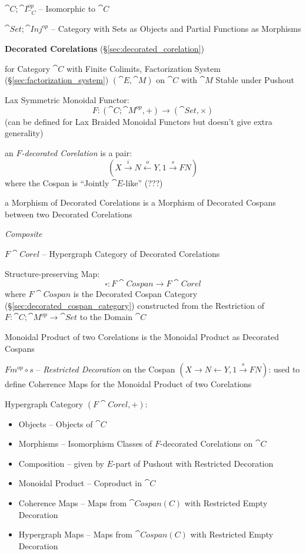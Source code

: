 $\cat{C};\cat{I}_{\cat{C}}^{op}$ -- Isomorphic to $\cat{C}$

$\cat{Set};\cat{Inj}^{op}$ -- Category with Sets as Objects and
Partial Functions as Morphisms


\textbf{Decorated Corelations} (\S\ref{sec:decorated_corelation})

for Category $\cat{C}$ with Finite Colimits, Factorization System
(\S\ref{sec:factorization_system}) $(\cat{E},\cat{M})$ on $\cat{C}$
with $\cat{M}$ Stable under Pushout

Lax Symmetric Monoidal Functor:
\[
  F : (\cat{C};\cat{M}^{op}, +) \rightarrow (\cat{Set}, \times)
\]
(can be defined for Lax Braided Monoidal Functors but doesn't give
extra generality)

an \emph{$F$-decorated Corelation} is a pair:
\[
  (X \xrightarrow{i} N \xleftarrow{o} Y, 1 \xrightarrow{s} F N)
\]
where the Cospan is ``Jointly $\cat{E}$-like'' (???) %

a Morphism of Decorated Corelations is a Morphism of Decorated Cospans
between two Decorated Corelations


\emph{Composite} %


\asterism


$F\cat{Corel}$ -- Hypergraph Category of Decorated Corelations

Structure-preserving Map:
\[
  \square : F\cat{Cospan} \rightarrow F\cat{Corel}
\]
where $F\cat{Cospan}$ is the Decorated Cospan Category
(\S\ref{sec:decorated_cospan_category}) constructed from the
Restriction of $F : \cat{C};\cat{M}^{op} \rightarrow \cat{Set}$ to the
Domain $\cat{C}$

Monoidal Product of two Corelations is the Monoidal Product as
Decorated Cospans

$F m^{op} \circ s$ -- \emph{Restricted Decoration} on the Cospan $(X
\rightarrow N \leftarrow Y, 1 \xrightarrow{s} F N)$: used to define
Coherence Maps for the Monoidal Product of two Corelations

Hypergraph Category $(F\cat{Corel}, +)$:
\begin{itemize}
  \item Objects -- Objects of $\cat{C}$
  \item Morphisms -- Isomorphism Classes of $F$-decorated Corelations
    on $\cat{C}$
  \item Composition -- given by $E$-part of Pushout with Restricted
    Decoration %
  \item Monoidal Product -- Coproduct in $\cat{C}$
  \item Coherence Maps -- Maps from $\cat{Cospan(C)}$ with Restricted
    Empty Decoration
  \item Hypergraph Maps -- Maps from $\cat{Cospan(C)}$ with Restricted
    Empty Decoration
\end{itemize}

